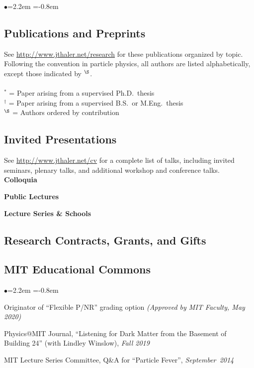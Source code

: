 \documentclass[11pt]{article}
\newcommand{\heading}[1]{\vspace{0in}\subsection*{#1} \vspace{.02in}}
\newcommand{\bbl}{\begin{list}{$\bullet$}{\leftmargin=2.2em \itemsep=-1pt \itemindent=-0.8em}}
\newcommand{\el}{\end{list}}
\begin{document}
\bbl

\el



\heading{Publications and Preprints}

See \url{http://www.jthaler.net/research} for these publications organized by topic.  Following the convention in particle physics, all authors are listed alphabetically, except those indicated by ${}^\S$. \\
~\\
\noindent ${}^\ast$ = Paper arising from a supervised Ph.D.\ thesis\\
\noindent ${}^\dagger$ = Paper arising from a supervised B.S.\ or M.Eng.\ thesis\\
\noindent ${}^\S$ = Authors ordered by contribution\\

\vspace{-.1in}
 



\heading{Invited Presentations}

See \url{http://www.jthaler.net/cv} for a complete list of talks, including invited seminars, plenary talks, and additional workshop and conference talks.\\

\noindent \textbf{Colloquia}




\noindent \textbf{Public Lectures}




\noindent \textbf{Lecture Series \& Schools}



  
\heading{Research Contracts, Grants, and Gifts}




\heading{MIT Educational Commons}

\bbl
\item Originator of ``Flexible P/NR'' grading option \textit{(Approved by MIT Faculty, May 2020)}

\item Physics@MIT Journal, ``Listening for Dark Matter from the Basement of Building 24'' (with Lindley Winslow), \textit{Fall 2019}
\item MIT Lecture Series Committee, Q\&A for ``Particle Fever'', \textit{September~2014}
\el
\end{document}
